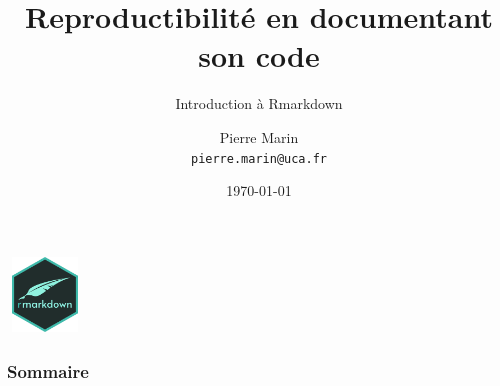 \documentclass[10pt, sans, compress, usenames, dvipsnames, aspectratio=169]{beamer}
\title{Reproductibilité en documentant son code}
\subtitle{Introduction à Rmarkdown}
\author[Pierre MARIN]{Pierre Marin\\\texttt{pierre.marin@uca.fr}}
\institute{Université Clermont Auvergne, AuBi, Mésocentre}
\date{\today}
\begin{document}
\begin{frame}
  \titlepage
  \includegraphics[width=2cm,height=2cm]{images/rmarkdown.png}
\end{frame}
\begin{frame}
  \frametitle{Sommaire}
   \tableofcontents
\end{frame}


\end{document}
